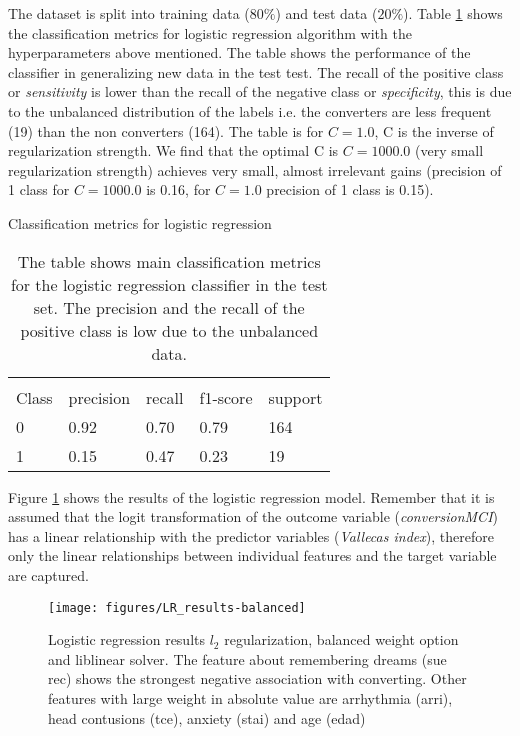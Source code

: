 \documentclass[11pt]{article}
\theoremstyle{definition}
\theoremstyle{remark}
\begin{document}
The dataset is split into training data ($80\%$) and test data ($20\%$). Table \ref{tab:logreg} shows the classification metrics for logistic regression algorithm with the hyperparameters above mentioned. The table shows the performance of the classifier in generalizing new data in the test test. 
The recall of the positive class or \emph{sensitivity} is lower than the recall of the negative class or \emph{specificity}, this is due to the unbalanced distribution of the labels i.e. the converters are less frequent (19) than the non converters (164). The table is for $C = 1.0$, C is the inverse of regularization strength. We find that the optimal C is $C = 1000.0$ (very small regularization strength) achieves very small, almost irrelevant gains (precision of 1 class for $C = 1000.0$ is 0.16, for $C = 1.0$ precision of 1 class is 0.15). 

\begin{table}[H]
\caption{Classification metrics for logistic regression} \label{tab:logreg} 
\begin{center} 
\begin{tabular}{lllll}
\hline
\multicolumn{1}{c}{} \\
Class & precision & recall & f1-score & support     \\
\hline
0 & 0.92  &    0.70   &   0.79   &    164 \\
1 & 0.15  &    0.47   &   0.23   &     19 \\
\hline
\end{tabular}
\caption{The table shows main classification metrics for the logistic regression classifier in the test set. The precision and the recall of the positive class is low due to the unbalanced data.}
\end{center}
\end{table}

Figure \ref{fig:logresres} shows the results of the logistic regression model. Remember that it is assumed that the logit transformation of the outcome variable (\emph{conversionMCI}) has a linear relationship with the predictor variables (\emph{Vallecas index}), therefore only the linear relationships between individual features and the target variable are captured.

\begin{figure}[H]
        \centering
        \texttt{[image: figures/LR\_results-balanced]}
        \caption{Logistic regression results $l_2$ regularization, balanced weight option and liblinear solver. The feature about remembering dreams (sue rec) shows the strongest negative association with converting. Other features with large weight in absolute value are arrhythmia (arri), head contusions (tce), anxiety (stai) and age (edad)} \label{fig:logresres}
\end{figure}
\end{document}
